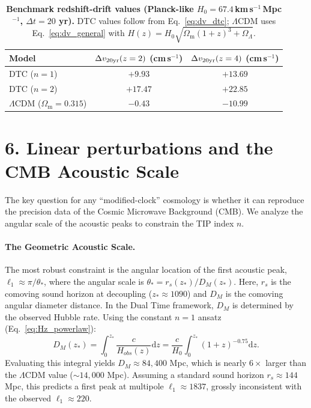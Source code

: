 \documentclass[12pt]{article}
\newcommand{\Om}{\Omega_{\mathrm{m}}}
\newcommand{\Ol}{\Omega_{\Lambda}}
\newcommand{\dd}{\mathrm{d}}
\begin{document}
\begin{table}[t]
\centering
\caption{\textbf{Benchmark redshift-drift values (Planck-like $H_{0}=67.4$\,km\,s$^{-1}$\,Mpc$^{-1}$, $\Delta t=20$ yr).}
DTC values follow from Eq.~\eqref{eq:dv_dtc}; $\Lambda$CDM uses Eq.~\eqref{eq:dv_general} with $H(z)=H_{0}\sqrt{\Om(1+z)^{3}+\Ol}$.}
\label{tab:drift}
\vspace{0.1cm}
\begin{tabular}{lcc}
\toprule
Model & $\Delta v_{20{\rm yr}}(z=2)$ (cm\,s$^{-1}$) & $\Delta v_{20{\rm yr}}(z=4)$ (cm\,s$^{-1}$)\\
\midrule
DTC ($n=1$) & $+9.93$ & $+13.69$\\
DTC ($n=2$) & $+17.47$ & $+22.85$\\
$\Lambda$CDM ($\Om=0.315$) & $-0.43$ & $-10.99$\\
\bottomrule
\end{tabular}
\end{table}

\section*{6. Linear perturbations and the CMB Acoustic Scale}
\label{sec:CMB}

The key question for any ``modified-clock'' cosmology is whether it can reproduce the precision data of the Cosmic Microwave Background (CMB). We analyze the angular scale of the acoustic peaks to constrain the TIP index $n$.

\paragraph{The Geometric Acoustic Scale.}
The most robust constraint is the angular location of the first acoustic peak, $\ell_1 \approx \pi / \theta_*$, where the angular scale is $\theta_* = r_s(z_*)/D_M(z_*)$.
Here, $r_s$ is the comoving sound horizon at decoupling ($z_* \approx 1090$) and $D_M$ is the comoving angular diameter distance.
In the Dual Time framework, $D_M$ is determined by the observed Hubble rate. Using the constant $n=1$ ansatz (Eq.~\eqref{eq:Hz_powerlaw}):
\begin{equation}
D_M(z_*) = \int_0^{z_*} \frac{c}{H_{obs}(z)} \dd z = \frac{c}{H_0} \int_0^{z_*} (1+z)^{-0.75} \dd z.
\end{equation}
Evaluating this integral yields $D_M \approx 84,400$ Mpc, which is nearly $6\times$ larger than the $\Lambda$CDM value ($\sim 14,000$ Mpc).
Assuming a standard sound horizon $r_s \approx 144$ Mpc, this predicts a first peak at multipole $\ell_1 \approx 1837$, grossly inconsistent with the observed $\ell_1 \approx 220$.
\end{document}
